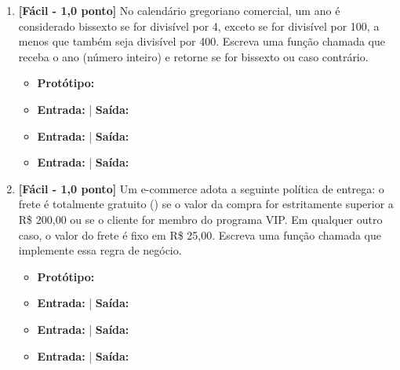 \begin{enumerate}[label=\textbf{Q\arabic*.}, start=11]
\item \textbf{[Fácil - 1,0 ponto]} No calendário gregoriano comercial, um ano é considerado bissexto se for divisível por 4, exceto se for divisível por 100, a menos que também seja divisível por 400. Escreva uma função chamada  que receba o ano (número inteiro) e retorne  se for bissexto ou  caso contrário.

\begin{itemize}[leftmargin=*]
    \item \textbf{Protótipo:}\newline {}
    \item \textbf{Entrada:}  | \textbf{Saída:} 
    \item \textbf{Entrada:}  | \textbf{Saída:} 
    \item \textbf{Entrada:}  | \textbf{Saída:} 
\end{itemize}



\vspace{0.4cm}

\item \textbf{[Fácil - 1,0 ponto]} Um e-commerce adota a seguinte política de entrega: o frete é totalmente gratuito () se o valor da compra for estritamente superior a R\$ 200,00 ou se o cliente for membro do programa VIP. Em qualquer outro caso, o valor do frete é fixo em R\$ 25,00. Escreva uma função chamada  que implemente essa regra de negócio.

\begin{itemize}[leftmargin=*]
    \item \textbf{Protótipo:}\newline {}
    \item \textbf{Entrada:}  | \textbf{Saída:} 
    \item \textbf{Entrada:}  | \textbf{Saída:} 
    \item \textbf{Entrada:}  | \textbf{Saída:} 
\end{itemize}



\vspace{0.4cm}


\end{enumerate}
